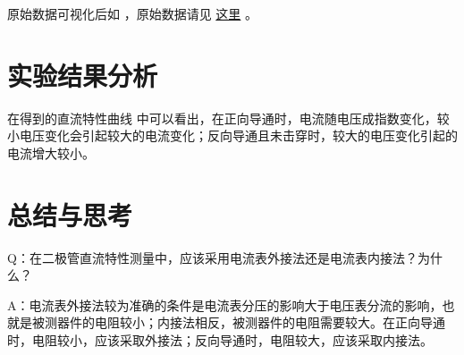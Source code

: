 \documentclass[lang=cn,11pt,a4paper,cite=authoryear]{elegantpaper}
\begin{document}
原始数据可视化后如 ，原始数据请见 \href{https://github.com/PannenetsF/Mirco-Electronic-Device-Experiment/tree/main/homework/hw07/01led}{这里} 。


\section{实验结果分析}

在得到的直流特性曲线  中可以看出，在正向导通时，电流随电压成指数变化，较小电压变化会引起较大的电流变化；反向导通且未击穿时，较大的电压变化引起的电流增大较小。

\section{总结与思考}

Q：在二极管直流特性测量中，应该采用电流表外接法还是电流表内接法？为什么？

A：电流表外接法较为准确的条件是电流表分压的影响大于电压表分流的影响，也就是被测器件的电阻较小；内接法相反，被测器件的电阻需要较大。在正向导通时，电阻较小，应该采取外接法；反向导通时，电阻较大，应该采取内接法。


\end{document}
